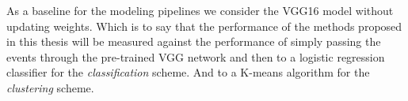 As a baseline for the modeling pipelines we consider the VGG16 model without updating weights. Which is to say that the performance of the methods proposed in this thesis will be measured against the performance of simply passing the events through the pre-trained VGG network and then to a logistic regression classifier for the \textit{classification} scheme. And to a K-means algorithm for the \textit{clustering} scheme.
